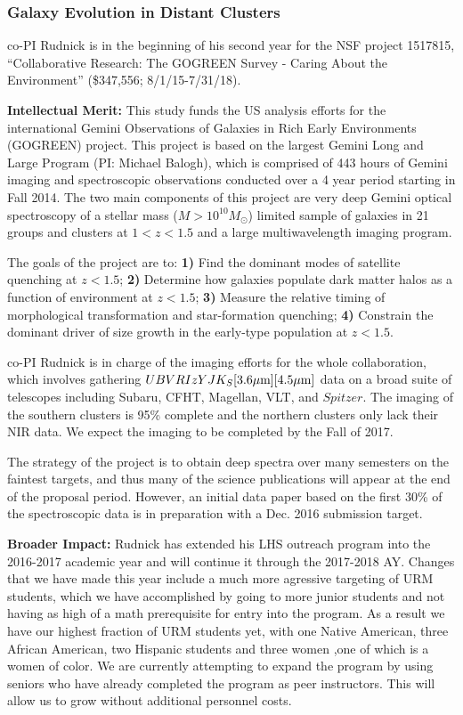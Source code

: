 \documentclass[11pt, preprint]{aastex}
\begin{document}
{\vspace*{-.7cm}
\subsubsection{Galaxy Evolution in Distant Clusters}
\vspace*{-.4cm}
\label{Sec:gogreen_prior}

co-PI Rudnick is in the beginning of his second year for the NSF
project 1517815, ``Collaborative Research: The GOGREEN Survey - Caring
About the Environment'' (\$347,556; 8/1/15-7/31/18).

\textbf{Intellectual Merit:} This study funds the US analysis efforts
for the international Gemini Observations of Galaxies in Rich Early
Environments (GOGREEN) project.  This project is based on the largest
Gemini Long and Large Program (PI: Michael Balogh), which is comprised
of 443 hours of Gemini imaging and spectroscopic observations
conducted over a 4 year period starting in Fall 2014.  The two main
components of this project are very deep Gemini optical spectroscopy
of a stellar mass ($M>10^{10}M_\odot$) limited sample of galaxies in
21 groups and clusters at $1<z<1.5$ and a large multiwavelength
imaging program. 

The goals of the project are to: \textbf{1)} Find the dominant modes
of satellite quenching at $z<1.5$; \textbf{2)} Determine how galaxies
populate dark matter halos as a function of environment at $z<1.5$;
\textbf{3)} Measure the relative timing of morphological
transformation and star-formation quenching; \textbf{4)} Constrain the
dominant driver of size growth in the early-type population at
\boldmath$z<1.5$.  

co-PI Rudnick is in charge of the imaging efforts for the whole
collaboration, which involves gathering
$UBVRIzYJK_S[3.6\mbox{$\mu$m}][4.5\mbox{$\mu$m}]$ data on a broad suite of
telescopes including Subaru, CFHT, Magellan, VLT, and $Spitzer$.  The
imaging of the southern clusters is 95\% complete and the northern
clusters only lack their NIR data.  We expect the imaging to be
completed by the Fall of 2017.

The strategy of the project is to obtain deep spectra over many
semesters on the faintest targets, and thus many of the science
publications will appear at the end of the proposal period.  However,
an initial data paper based on the first 30\% of the spectroscopic
data is in preparation with a Dec. 2016 submission target.

\textbf{Broader Impact:} Rudnick has extended his LHS outreach program
into the 2016-2017 academic year and will continue it through the
2017-2018 AY.  Changes that we have made this year include a much more
agressive targeting of URM students, which we have accomplished by
going to more junior students and not having as high of a math
prerequisite for entry into the program.  As a result we have our
highest fraction of URM students yet, with one Native American, three
African American, two Hispanic students and three women ,one of which
is a women of color.  We are currently attempting to expand the
program by using seniors who have already completed the program as
peer instructors.  This will allow us to grow without additional
personnel costs.

}
\end{document}
